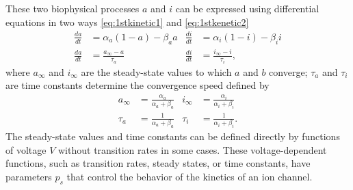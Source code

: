 \documentclass[11pt]{article}
\begin{document}
These two biophysical processes $a$ and $i$ can be expressed using differential equations in two ways \eqref{eq:1stkinetic1} and \eqref{eq:1stkenetic2}
\begin{align}
    \label{eq:1stkinetic1}
    \frac{da}{dt} &=\alpha_{a}(1-a)-\beta_{a}a   &\frac{di}{dt} &=\alpha_{i}(1-i)-\beta_{i}i \\
    \label{eq:1stkenetic2}
    \frac{da}{dt} &= \frac{a_{\infty}-a}{\tau_{a}}  &\frac{di}{dt} &= \frac{i_{\infty}-i}{\tau_{i}},
\end{align}
where $a_{\infty}$ and $i_{\infty}$ are the steady-state values to which $a$ and $b$ converge; $\tau_{a}$ and $\tau_{i}$ are time constants determine the convergence speed defined by
\begin{align}
    a_{\infty} &= \frac{\alpha_{a}}{\alpha_{a}+\beta_{a}} & i_{\infty} &=  \frac{\alpha_{i}}{\alpha_{i}+\beta_{i}} \\
    \tau_{a} &= \frac{1}{\alpha_{a}+\beta_{a}} & \tau_{i} &= \frac{1}{\alpha_{i}+\beta_{i}}.
\end{align}
The steady-state values and time constants can be defined directly by functions of voltage $V$ without transition rates in some cases. These voltage-dependent functions, such as transition rates, steady states, or time constants, have parameters $p_{s}$ that control the behavior of the kinetics of an ion channel.
\end{document}
